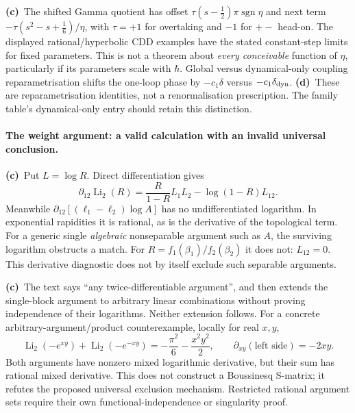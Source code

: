 \documentclass[11pt,a4paper]{article}
\newcommand{\Lc}{\textbf{(c)}\ }
\newcommand{\Ld}{\textbf{(d)}\ }
\begin{document}
\Lc The shifted Gamma quotient has offset
$\tau(s-\tfrac12)\pi\operatorname{sgn}\eta$ and next term
$-\tau(s^2-s+\tfrac16)/\eta$, with $\tau=+1$ for overtaking and $-1$ for
$+-$ head-on. The displayed rational/hyperbolic CDD examples have the stated
constant-step limits for fixed parameters. This is not a theorem about
\emph{every conceivable} function of $\eta$, particularly if its parameters
scale with $\hbar$. Global versus dynamical-only coupling reparametrisation
shifts the one-loop phase by $-c_1\delta$ versus $-c_1\delta_{\rm dyn}$.
\Ld These are reparametrisation identities, not a renormalisation prescription.
The family table's dynamical-only entry should retain this distinction.

\paragraph{The weight argument: a valid calculation with an invalid universal conclusion.}
\Lc Put $L=\log R$. Direct differentiation gives
\begin{equation}
 \partial_{12}\operatorname{Li}_2(R)
 =\frac{R}{1-R}L_1L_2-\log(1-R)L_{12}.
 \label{eq:dilog}
\end{equation}
Meanwhile $\partial_{12}[(\ell_1-\ell_2)\log A]$ has no undifferentiated
logarithm. In exponential rapidities it is rational, as is the derivative
of the topological term. For a generic single \emph{algebraic} nonseparable
argument such as $A$, the surviving logarithm obstructs a match. For
$R=f_1(\beta_1)/f_2(\beta_2)$ it does not: $L_{12}=0$.
This derivative diagnostic does not by itself exclude such separable arguments.

\Lc The text says ``any twice-differentiable argument'', and then extends
the single-block argument to arbitrary linear combinations without proving
independence of their logarithms. Neither extension follows. For a concrete
arbitrary-argument/product counterexample, locally for real $x,y$,
\begin{equation}
 \operatorname{Li}_2(-e^{xy})+\operatorname{Li}_2(-e^{-xy})
 =-\frac{\pi^2}{6}-\frac{x^2y^2}{2},\qquad
 \partial_{xy}(\text{left side})=-2xy.
\end{equation}
Both arguments have nonzero mixed logarithmic derivative, but their sum has
rational mixed derivative. This does not construct a Boussinesq S-matrix;
it refutes the proposed universal exclusion mechanism. Restricted rational
argument sets require their own functional-independence or singularity proof.
\end{document}
